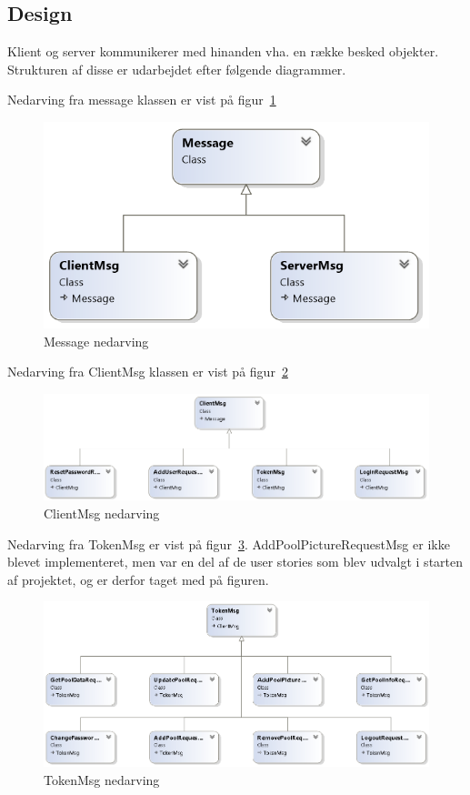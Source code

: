 \subsection{Design}

Klient og server kommunikerer med hinanden vha. en række besked objekter. Strukturen af disse er udarbejdet efter følgende diagrammer.

Nedarving fra message klassen er vist på figur~\ref{fig:MessageUML}
\begin{figure}
	\centering
	\includegraphics[width=0.6\linewidth]{figs/connection/MessageUML.png}
	\caption{Message nedarving}
	\label{fig:MessageUML}
\end{figure}

Nedarving fra ClientMsg klassen er vist på figur~\ref{fig:ClientMsgUML}
\begin{figure}
	\centering
	\includegraphics[width=0.9\linewidth]{figs/connection/ClientMsgUML.png}
	\caption{ClientMsg nedarving}
	\label{fig:ClientMsgUML}
\end{figure}

Nedarving fra TokenMsg er vist på figur~\ref{fig:TokenMsgUML}. AddPoolPictureRequestMsg er ikke blevet implementeret, men var en del af de user stories som blev udvalgt i starten af projektet, og er derfor taget med på figuren.
\begin{figure}
	\centering
	\includegraphics[width=0.9\linewidth]{figs/connection/TokenMsgUML.png}
	\caption{TokenMsg nedarving}
	\label{fig:TokenMsgUML}
\end{figure}

